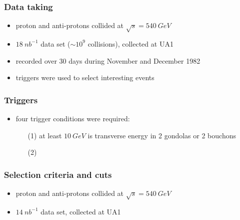 \documentclass[xcolor=table]{beamer}
\begin{document}
\begin{frame}
\frametitle{Data taking}

\begin{itemize}
\item proton and anti-protons collided at $\sqrt{s}=\SI{540}{GeV}$
\item $\SI{18}{nb^{-1}}$ data set ($\sim 10^9$ collisions), collected at UA1
\item recorded over 30 days during November and December 1982
\item triggers were used to select interesting events
\end{itemize}

\end{frame}


\begin{frame}
\frametitle{Triggers}
\fontsize{9pt}{12}\selectfont

\begin{itemize}
\item four trigger conditions were required:
\begin{enumerate}
\item[(1)] at least $\SI{10}{GeV}$ is transverse energy in 2 gondolas or 2 bouchons
\item[(2)]
\end{enumerate}
\end{itemize}



\end{frame}




\begin{frame}
\frametitle{Selection criteria and cuts}

\begin{itemize}
\item proton and anti-protons collided at $\sqrt{s}=\SI{540}{GeV}$
\item $\SI{14}{nb^{-1}}$ data set, collected at UA1
\end{itemize}

\end{frame}



 
\end{document}
